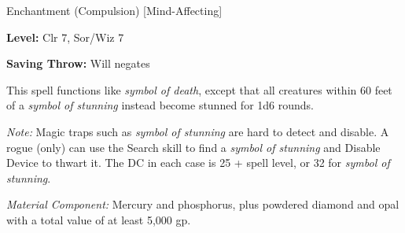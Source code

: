 
Enchantment (Compulsion) [Mind-Affecting]

\textbf{Level:} Clr 7, Sor/Wiz 7

\textbf{Saving Throw:} Will negates

This spell functions like \textit{symbol of death}, except that all creatures within 
60 feet of a \textit{symbol of stunning} instead become stunned for 1d6 rounds.

\textit{Note:} Magic traps such as \textit{symbol of stunning} are hard to detect 
and disable. A rogue (only) can use the Search skill to find a \textit{symbol of 
stunning} and Disable Device to thwart it. The DC in each case is 25 + spell level, 
or 32 for \textit{symbol of stunning}.

\textit{Material Component:} Mercury and phosphorus, plus powdered diamond and 
opal with a total value of at least 5,000 gp.

